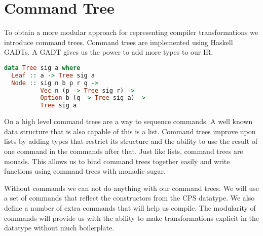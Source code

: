 
\chapter{\label{chap:commandtree}Command Tree}
To obtain a more modular approach for representing compiler transformations we introduce command trees\autocite{commandtreespoulsen}. Command trees are implemented using Haskell \acp{GADT}. A \ac{GADT} gives us the power to add more types to our \ac{IR}.

\begin{lstlisting}[language=Haskell]
data Tree sig a where
  Leaf :: a -> Tree sig a
  Node :: sig n b p r q ->
          Vec n (p -> Tree sig r) ->
          Option b (q -> Tree sig a) ->
          Tree sig a
\end{lstlisting}


On a high level command trees are a way to sequence commands. A well known data structure that is also capable of this is a list. Command trees improve upon lists by adding types that restrict its structure and the ability to use the result of one command in the commands after that. Just like lists, command trees are monads. This allows us to bind command trees together easily and write functions using command trees with monadic sugar.

Without commands we can not do anything with our command trees. We will use a set of commands that reflect the constructors from the \ac{CPS} datatype. We also define a number of extra commands that will help us compile. The modularity of commands will provide us with the ability to make transformations explicit in the datatype without much boilerplate.

% 
